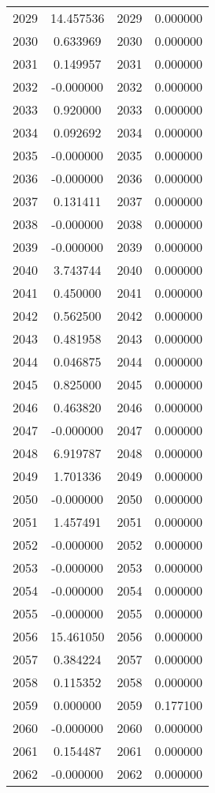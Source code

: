 \documentclass[12pt]{article}
\begin{document}
\begin{longtable}{@{}cccc@{}}
2029 & 14.457536 & 2029 & 0.000000 \\
2030 & 0.633969 & 2030 & 0.000000 \\
2031 & 0.149957 & 2031 & 0.000000 \\
2032 & -0.000000 & 2032 & 0.000000 \\
2033 & 0.920000 & 2033 & 0.000000 \\
2034 & 0.092692 & 2034 & 0.000000 \\
2035 & -0.000000 & 2035 & 0.000000 \\
2036 & -0.000000 & 2036 & 0.000000 \\
2037 & 0.131411 & 2037 & 0.000000 \\
2038 & -0.000000 & 2038 & 0.000000 \\
2039 & -0.000000 & 2039 & 0.000000 \\
2040 & 3.743744 & 2040 & 0.000000 \\
2041 & 0.450000 & 2041 & 0.000000 \\
2042 & 0.562500 & 2042 & 0.000000 \\
2043 & 0.481958 & 2043 & 0.000000 \\
2044 & 0.046875 & 2044 & 0.000000 \\
2045 & 0.825000 & 2045 & 0.000000 \\
2046 & 0.463820 & 2046 & 0.000000 \\
2047 & -0.000000 & 2047 & 0.000000 \\
2048 & 6.919787 & 2048 & 0.000000 \\
2049 & 1.701336 & 2049 & 0.000000 \\
2050 & -0.000000 & 2050 & 0.000000 \\
2051 & 1.457491 & 2051 & 0.000000 \\
2052 & -0.000000 & 2052 & 0.000000 \\
2053 & -0.000000 & 2053 & 0.000000 \\
2054 & -0.000000 & 2054 & 0.000000 \\
2055 & -0.000000 & 2055 & 0.000000 \\
2056 & 15.461050 & 2056 & 0.000000 \\
2057 & 0.384224 & 2057 & 0.000000 \\
2058 & 0.115352 & 2058 & 0.000000 \\
2059 & 0.000000 & 2059 & 0.177100 \\
2060 & -0.000000 & 2060 & 0.000000 \\
2061 & 0.154487 & 2061 & 0.000000 \\
2062 & -0.000000 & 2062 & 0.000000 \\

\end{longtable}
\end{document}
